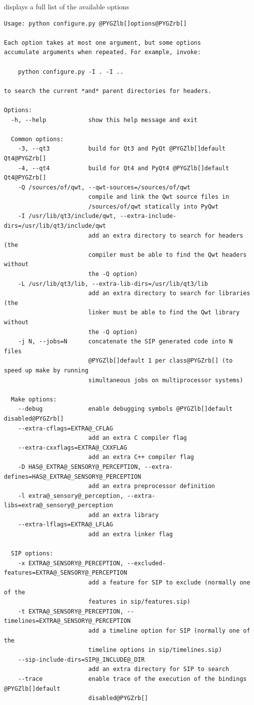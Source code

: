 \documentclass[a4paper,10pt,english]{manual}
\begin{document}
\begin{enumerate}
displays a full list of the available options

\begin{Verbatim}[commandchars=@\[\]]
Usage: python configure.py @PYGZlb[]options@PYGZrb[]

Each option takes at most one argument, but some options
accumulate arguments when repeated. For example, invoke:

	python configure.py -I . -I ..

to search the current *and* parent directories for headers.

Options:
  -h, --help            show this help message and exit

  Common options:
    -3, --qt3           build for Qt3 and PyQt @PYGZlb[]default Qt4@PYGZrb[]
    -4, --qt4           build for Qt4 and PyQt4 @PYGZlb[]default Qt4@PYGZrb[]
    -Q /sources/of/qwt, --qwt-sources=/sources/of/qwt
                        compile and link the Qwt source files in
                        /sources/of/qwt statically into PyQwt
    -I /usr/lib/qt3/include/qwt, --extra-include-dirs=/usr/lib/qt3/include/qwt
                        add an extra directory to search for headers (the
                        compiler must be able to find the Qwt headers without
                        the -Q option)
    -L /usr/lib/qt3/lib, --extra-lib-dirs=/usr/lib/qt3/lib
                        add an extra directory to search for libraries (the
                        linker must be able to find the Qwt library without
                        the -Q option)
    -j N, --jobs=N      concatenate the SIP generated code into N files
                        @PYGZlb[]default 1 per class@PYGZrb[] (to speed up make by running
                        simultaneous jobs on multiprocessor systems)

  Make options:
    --debug             enable debugging symbols @PYGZlb[]default disabled@PYGZrb[]
    --extra-cflags=EXTRA@_CFLAG
                        add an extra C compiler flag
    --extra-cxxflags=EXTRA@_CXXFLAG
                        add an extra C++ compiler flag
    -D HAS@_EXTRA@_SENSORY@_PERCEPTION, --extra-defines=HAS@_EXTRA@_SENSORY@_PERCEPTION
                        add an extra preprocessor definition
    -l extra@_sensory@_perception, --extra-libs=extra@_sensory@_perception
                        add an extra library
    --extra-lflags=EXTRA@_LFLAG
                        add an extra linker flag

  SIP options:
    -x EXTRA@_SENSORY@_PERCEPTION, --excluded-features=EXTRA@_SENSORY@_PERCEPTION
                        add a feature for SIP to exclude (normally one of the
                        features in sip/features.sip)
    -t EXTRA@_SENSORY@_PERCEPTION, --timelines=EXTRA@_SENSORY@_PERCEPTION
                        add a timeline option for SIP (normally one of the
                        timeline options in sip/timelines.sip)
    --sip-include-dirs=SIP@_INCLUDE@_DIR
                        add an extra directory for SIP to search
    --trace             enable trace of the execution of the bindings @PYGZlb[]default
                        disabled@PYGZrb[]


\end{Verbatim}
\end{enumerate}
\end{document}
